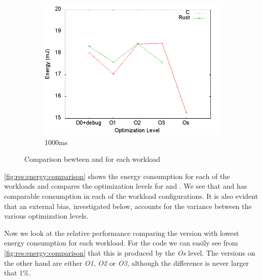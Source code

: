 \begin{figure}[H]
  \begin{subfigure}{0.49\textwidth}
    \includegraphics[width=\textwidth]{results/plots/energy/1000.png}
    \caption{1000ms}
    \label{}
  \end{subfigure}

  \caption{Comparison bewteen {\rust} and {\C} for each workload}
  \label{fig:res:energy:comparison}
\end{figure}

\autoref{fig:res:energy:comparison} shows the energy consumption for each of the workloads and compares the optimization levels for {\rust} and {\C}.
We see that {\rust} and {\C} has comparable consumption in each of the workload configurations.
It is also evident that an external bias, investigated below, accounts for the variance between the various optimization levels.

Now we look at the relative performance comparing the version with lowest energy consumption for each workload.
For the {\C} code we can easily see from \autoref{fig:res:energy:comparison} that this is produced by the \emph{Os} level.
The {\rust} versions on the other hand are either \emph{O1}, \emph{O2} or \emph{O3}, although the difference is never larger that 1\%.

